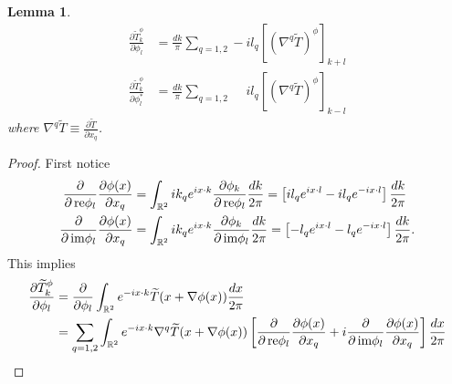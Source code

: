 \documentclass[noinfoline]{imsart}
\newtheorem{lemma}{Lemma}
\newcommand{\re}{\text{\,\rm re}}
\newcommand{\im}{\text{\,\rm im}}
\begin{document}
\begin{lemma} 
\label{partialconj}
\begin{align}
\frac{\partial \widetilde T^\phi_k}{\partial \phi_{ l} }  &= \frac{  dk}{\pi}\sum_{q=1,2} -il_q[(\nabla^q\widetilde T)^\phi]_{k+l} \\
\frac{\partial \widetilde T^\phi_k}{\partial \phi^*_{ l} }  & = \frac{ dk }{\pi}\sum_{q=1,2} \phantom{-}\!\!il_q [(\nabla^q\widetilde T)^\phi]_{k-l}
\end{align}
where $\nabla^q \widetilde T\equiv \frac{\partial \widetilde T}{\partial x_q}$.
\end{lemma}
\begin{proof}
First notice
\begin{align}
\label{partial1}
\frac{\partial}{\partial \re \phi_{ l}}\frac{\partial\phi(x)}{ \partial x_q}  &= \int_{\Bbb R^2} i  k_q e^{ix \cdot k} \frac{\partial \phi_k}{\partial \re \phi_l }  \frac{d k}{2\pi} 
=\left[i  l_q e^{ix \cdot  l}  - i  l_q e^{-i x \cdot  l}  \right] \frac{d k}{2\pi}   \\
\label{partial2}
\frac{\partial}{\partial \im \phi_{ l}}\frac{\partial\phi(x)}{ \partial x_q}  &= \int_{\Bbb R^2} i  k_q e^{ix \cdot  k} \frac{\partial \phi_ k}{\partial \im \phi_{l} }  \frac{d k}{2\pi} 
=\left[-  l_q e^{ix \cdot  l}  -  l_q e^{-i x \cdot  l}  \right] \frac{d k}{2\pi}.  
\end{align}
This implies
\begin{align}
\nonumber \frac{\partial \widetilde T^\phi_k}{\partial \phi_{ l} } 
&=  \frac{\partial}{\partial  \phi_{ l} } \int_{\Bbb R^2}  e^{-ix \cdot k}\widetilde T(x+\nabla \phi(x))\frac{dx}{2\pi} \\
\nonumber &= \sum_{q=1,2}  \int_{\Bbb R^2} e^{-ix \cdot k} \nabla^q\widetilde T(x+\nabla \phi(x))\left[ \frac{\partial}{\partial \re \phi_{ l}}\frac{\partial\phi(x)}{ \partial x_q} +i  \frac{\partial}{\partial \im \phi_{ l}}\frac{\partial\phi(x)}{ \partial x_q}\right]\frac{dx}{2\pi}\\

\end{align}
\end{proof}
\end{document}
